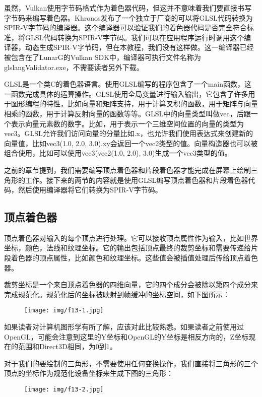 \documentclass{ctexart}
\begin{document}
虽然，Vulkan使用字节码格式作为着色器代码，但这并不意味着我们要直接书写字节码来编写着色器。Khronos发布了一个独立于厂商的可以将GLSL代码转换为SPIR-V字节码的编译器。这个编译器可以验证我们的着色器代码是否完全符合标准，将GLSL代码转换为SPIR-V字节码。我们可以在应用程序运行时调用这个编译器，动态生成SPIR-V字节码，但在本教程，我们没有这样做。这一编译器已经被包含在了LunarG的Vulkan SDK中，编译器可执行文件名称为glslangValidator.exe，不需要读者另外下载。

GLSL是一个类C的着色器语言。使用GLSL编写的程序包含了一个main函数，这一函数完成具体的运算操作。GLSL使用全局变量进行输入输出，它包含了许多用于图形编程的特性，比如向量和矩阵支持，用于计算叉积的函数，用于矩阵与向量相乘的函数，用于计算反射向量的函数等等。GLSL中的向量类型叫做vec，后跟一个表示向量元素数的数字。比如，用于表示一个三维空间位置的向量的类型为vec3。GLSL允许我们访问向量的分量比如.x，也允许我们使用表达式来创建新的向量值，比如vec3(1.0, 2.0, 3.0).xy会返回一个vec2类型的值。向量构造器也可以被组合使用，比如可以使用vec3(vec2(1.0, 2.0), 3.0)生成一个vec3类型的值。

之前的章节提到，我们需要编写顶点着色器和片段着色器才能完成在屏幕上绘制三角形的工作。接下来的两节的内容就是使用GLSL编写顶点着色器和片段着色器代码，然后使用编译器将它们转换为SPIR-V字节码。

\subsection{顶点着色器}

顶点着色器对输入的每个顶点进行处理。它可以接收顶点属性作为输入，比如世界坐标，颜色，法线和纹理坐标。它的输出包括顶点最终的裁剪坐标和需要传递给片段着色器的顶点属性，比如颜色和纹理坐标。这些值会被插值处理后传给顶点着色器。

裁剪坐标是一个来自顶点着色器的四维向量，它的四个成分会被除以第四个成分来完成规范化。规范化后的坐标被映射到帧缓冲的坐标空间，如下图所示：

\begin{figure}[H]
	\centering
	\texttt{[image: img/f13-1.jpg]}
\end{figure}

如果读者对计算机图形学有所了解，应该对此比较熟悉。如果读者之前使用过OpenGL，可能会注意到这里的Y坐标和OpenGL的Y坐标是相反方向的，Z坐标现在的范围和Direct3D相同，为0到1。

对于我们的要绘制的三角形，不需要使用任何变换操作，我们直接将三角形的三个顶点的坐标作为规范化设备坐标来生成下图的三角形：

\begin{figure}[H]
	\centering
	\texttt{[image: img/f13-2.jpg]}
\end{figure}
\end{document}
